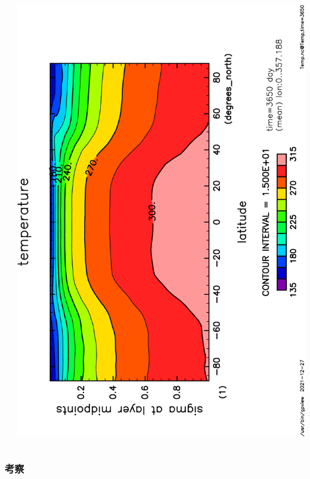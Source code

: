 \documentclass[aspectratio=149,9pt,fleqn]{beamer}
\begin{document}
\begin{frame}
\begin{columns}
\begin{column}{.4\textwidth}
		\end{column}
		\begin{column}{.4\textwidth}
			\includegraphics[height=\textwidth,angle=-90]{S1800Temp,time=3650-crop.pdf}
		\end{column}
	\end{columns}
\end{frame}

\begin{frame}
	\frametitle{考察}
\end{frame}
\end{document}
